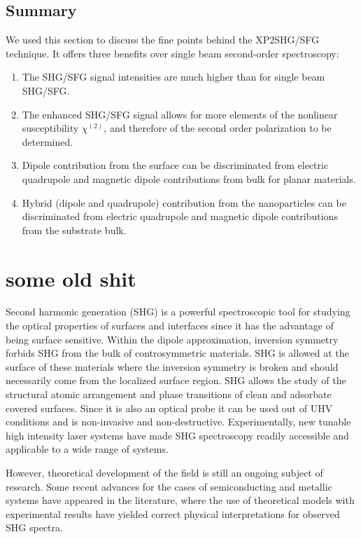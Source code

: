 \subsection{Summary}
We used this section to discuss the fine points behind the XP2SHG/SFG technique. It offers three benefits over single beam second-order spectroscopy:

\begin{enumerate}
\item The SHG/SFG signal intensities are much higher than for single beam SHG/SFG.
\item The enhanced SHG/SFG signal allows for more elements of the nonlinear susceptibility $\chi^{(2)}$, and therefore of the second order polarization to be determined.
\item Dipole contribution from the surface can be discriminated from electric quadrupole and magnetic dipole contributions from bulk for planar materials.
\item Hybrid (dipole and quadrupole) contribution from the nanoparticles can be discriminated from electric quadrupole and magnetic dipole contributions from the substrate bulk.
\end{enumerate}


\section{some old shit}

Second harmonic generation (SHG) is a powerful spectroscopic tool for studying
the optical properties of surfaces and interfaces since it has the advantage
of being surface sensitive. Within the dipole approximation, inversion
symmetry forbids SHG from the bulk of controsymmetric materials. SHG is
allowed at the surface of these materials where the inversion symmetry is
broken and should necessarily come from the localized surface region. SHG
allows the study of the structural atomic arrangement and phase transitions of
clean and adsorbate covered surfaces. Since it is also an optical probe it can
be used out of UHV conditions and is non-invasive and non-destructive.
Experimentally, new tunable high intensity laser systems have made SHG
spectroscopy readily accessible and applicable to a wide range of
systems.\cite{downerSIA01,lupkeSSR99}

However, theoretical development of the field is still an ongoing subject of
research. Some recent advances for the cases of semiconducting and metallic
systems have appeared in the literature, where the use of theoretical models
with experimental results have yielded correct physical interpretations for
observed SHG spectra. \cite{downerSIA01, mendozaPRB01, limPRB00,
gavrilenkoTSF00, mendozaPRB99, mendozaPRL98, mendozaPRB96b, mendozaPRB97,
guyotPRB90}

